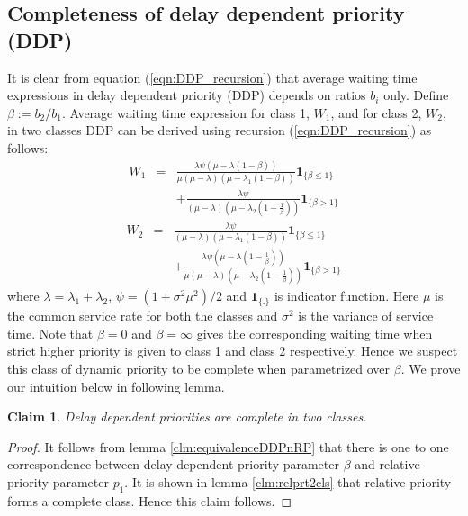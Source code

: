 \documentclass[a4paper,12pt]{article}
\newtheorem{claim}[thm]{Claim}
\begin{document}




\begin{appendices}
\section{Completeness of delay dependent priority (DDP)}
\label{proof:DDP_cmplt}
It is clear from equation (\ref{eqn:DDP_recursion}) that average waiting time expressions in delay dependent priority (DDP) depends on ratios $b_i$ only. Define $\beta := b_2/b_1$. Average waiting time expression for class 1, $W_1$, and for class 2, $W_2$, in two classes DDP can be derived using recursion (\ref{eqn:DDP_recursion}) as follows:
\begin{eqnarray}\nonumber
W_1 &=& \frac{\lambda \psi (\mu-\lambda(1-\beta))}{\mu(\mu-\lambda)(\mu-\lambda_1(1-\beta))}\mathbf{1}_{\{\beta \leq 1\}}\\\label{eqn:DDPclass1}
&&+\frac{\lambda \psi }{(\mu-\lambda)(\mu -\lambda_2(1-\frac{1}{\beta}))}\mathbf{1}_{\{\beta > 1\}}
\end{eqnarray}
\begin{eqnarray}\nonumber
W_2 &=&\frac{\lambda \psi}{(\mu-\lambda)(\mu -\lambda_1(1-\beta))}\mathbf{1}_{\{\beta \leq 1\}}\\\label{eqn:DDPclass2}
&&+ \frac{\lambda \psi(\mu-\lambda(1-\frac{1}{\beta}))}{\mu(\mu-\lambda)(\mu-\lambda_2(1-\frac{1}{\beta}))}\mathbf{1}_{\{\beta > 1\}}
\end{eqnarray}
where $\lambda = \lambda_1 + \lambda_2$, $\psi = (1+\sigma^2 \mu^2)/2$ and $\mathbf{1_{\{.\}}}$ is indicator function. Here $\mu$ is the common service rate for both the classes and $\sigma^2$ is the variance of service time. Note that $\beta = 0$ and $\beta = \infty$ gives the corresponding waiting time when strict higher priority is given to class 1 and class 2 respectively. Hence we suspect this class of dynamic priority to be complete when parametrized over $\beta$. We prove our intuition below in following lemma.  
\begin{claim} \textit{Delay dependent priorities are complete in two classes.}
\end{claim}
\begin{proof}
It follows from lemma \ref{clm:equivalenceDDPnRP} that there is one to one correspondence between delay dependent priority parameter $\beta$ and relative priority parameter $p_1$. It is shown in lemma \ref{clm:relprt2cls} that relative priority forms a complete class. Hence this claim follows.
\end{proof}


\end{appendices}
\end{document}

